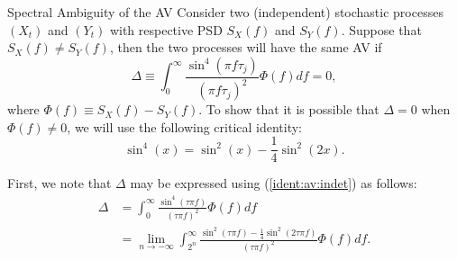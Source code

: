 \documentclass[envcountsect,usenames,dvipsnames]{beamer}
\theoremstyle{mystyle}
\begin{document}
\begin{frame}{Spectral Ambiguity of the AV}
\small
Consider two (independent) stochastic processes $(X_t)$ and $(Y_t)$ with respective PSD $S_X(f)$ and $S_Y(f)$. Suppose that $S_X(f) \neq S_Y(f)$, then the two processes will have the same AV if
%
\begin{equation*}
     \Delta \equiv \int_0^{\infty}  \frac{\sin^4(\pi f \tau_j)}{(\pi f \tau_j)^2} \Phi(f) df = 0,
\end{equation*}
%
where $\Phi(f) \equiv S_{X}(f) - S_{Y}(f)$. To show that it is possible that $\Delta = 0$ when $\Phi(f) \neq 0$, we will use the following critical identity:
%
\begin{equation}
    \label{ident:av:indet}
    \sin^4(x) = \sin^2(x) - \frac{1}{4} \sin^2(2x).
\end{equation}

First, we note that $\Delta$ may be expressed using (\ref{ident:av:indet}) as follows:
\begin{equation*}
    \begin{aligned}
        \Delta &=  \int_{0}^{\infty} \frac{\sin^4\left(\tau \pi f \right)}{\left(\tau \pi f \right)^2} \Phi(f) df \\
        &= \lim_{n \rightarrow -\infty} \int_{2^{n}}^{\infty} \frac{\sin^2\left(\tau \pi f \right) - \frac{1}{4} \sin^2\left(2 \tau \pi f \right) }{\left(\tau \pi f \right)^2} \Phi(f) df .
    \end{aligned}
\end{equation*}

\end{frame}
% 
\end{document}
